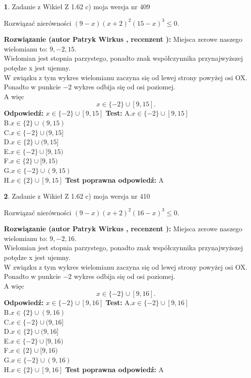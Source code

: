 \documentclass[12pt, a4paper]{article}
\theoremstyle{definition} %
\newtheorem{zad}{}
\newcommand{\zadStart}[1]{\begin{zad}#1\newline}
\newcommand{\zadStop}{\end{zad}}
\newcommand{\rozwStart}[2]{\noindent \textbf{Rozwiązanie (autor #1 , recenzent #2): }\newline}
\newcommand{\rozwStop}{\newline}
\newcommand{\odpStart}{\noindent \textbf{Odpowiedź:}\newline}
\newcommand{\odpStop}{\newline}
\newcommand{\testStart}{\noindent \textbf{Test:}\newline}
\newcommand{\testStop}{\newline}
\newcommand{\kluczStart}{\noindent \textbf{Test poprawna odpowiedź:}\newline}
\newcommand{\kluczStop}{\newline}
\begin{document}
\zadStart{Zadanie z Wikieł Z 1.62 c) moja wersja nr 409}

Rozwiązać nierówności $(9-x)(x+2)^{2}(15-x)^{3}\le0$.
\zadStop
\rozwStart{Patryk Wirkus}{}
Miejsca zerowe naszego wielomianu to: $9, -2, 15$.\\
Wielomian jest stopnia parzystego, ponadto znak współczynnika przy\linebreak najwyższej potędze x jest ujemny.\\ W związku z tym wykres wielomianu zaczyna się od lewej strony powyżej osi OX.\\
Ponadto w punkcie $-2$ wykres odbija się od osi poziomej.\\
A więc $$x \in \{-2\} \cup [9,15].$$
\rozwStop
\odpStart
$x \in \{-2\} \cup [9,15]$
\odpStop
\testStart
A.$x \in \{-2\} \cup [9,15]$\\
B.$x \in \{2\} \cup (9,15)$\\
C.$x \in \{-2\} \cup (9,15]$\\
D.$x \in \{2\} \cup (9,15]$\\
E.$x \in \{-2\} \cup [9,15)$\\
F.$x \in \{2\} \cup [9,15)$\\
G.$x \in \{-2\} \cup (9,15)$\\
H.$x \in \{2\} \cup [9,15]$
\testStop
\kluczStart
A
\kluczStop



\zadStart{Zadanie z Wikieł Z 1.62 c) moja wersja nr 410}

Rozwiązać nierówności $(9-x)(x+2)^{2}(16-x)^{3}\le0$.
\zadStop
\rozwStart{Patryk Wirkus}{}
Miejsca zerowe naszego wielomianu to: $9, -2, 16$.\\
Wielomian jest stopnia parzystego, ponadto znak współczynnika przy\linebreak najwyższej potędze x jest ujemny.\\ W związku z tym wykres wielomianu zaczyna się od lewej strony powyżej osi OX.\\
Ponadto w punkcie $-2$ wykres odbija się od osi poziomej.\\
A więc $$x \in \{-2\} \cup [9,16].$$
\rozwStop
\odpStart
$x \in \{-2\} \cup [9,16]$
\odpStop
\testStart
A.$x \in \{-2\} \cup [9,16]$\\
B.$x \in \{2\} \cup (9,16)$\\
C.$x \in \{-2\} \cup (9,16]$\\
D.$x \in \{2\} \cup (9,16]$\\
E.$x \in \{-2\} \cup [9,16)$\\
F.$x \in \{2\} \cup [9,16)$\\
G.$x \in \{-2\} \cup (9,16)$\\
H.$x \in \{2\} \cup [9,16]$
\testStop
\kluczStart
A
\kluczStop
\end{document}

